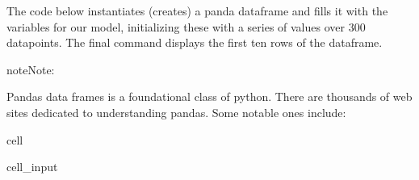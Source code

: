 \documentclass[letterpaper,10pt,english]{jupyterBook}
\begin{document}
\sphinxAtStartPar
The code below  instantiates (creates) a panda dataframe  and fills it with the variables for our model, initializing these with a series of values over 300 datapoints.  The final command displays the first ten rows of the dataframe.

\begin{sphinxadmonition}{note}{Note:}
\begin{sphinxVerbatim}[commandchars=\\\{\}]
Pandas data frames is a foundational class of python.  There are thousands of web sites dedicated to understanding pandas.  Some notable ones include:
\end{sphinxVerbatim}
\end{sphinxadmonition}

\begin{sphinxuseclass}{cell}\begin{sphinxVerbatimInput}

\begin{sphinxuseclass}{cell_input}
\begin{sphinxVerbatim}[commandchars=\\\{\}]
    
  \PYG{p}{[}\PYG{p}{]}
                   \PYG{p}{[}\PYG{p}{]} 
                   \PYG{p}{[}\PYG{p}{]} 
                    \PYG{p}{[}\PYG{p}{]} 
                    \PYG{p}{[}\PYG{p}{]} 
                    \PYG{p}{[}\PYG{p}{]} 
                   \PYG{p}{[}\PYG{p}{]}\PYG{p}{[}    \PYG{p}{]}
 
\end{sphinxVerbatim}


\end{sphinxuseclass}
\end{sphinxVerbatimInput}
\end{sphinxuseclass}
\end{document}
